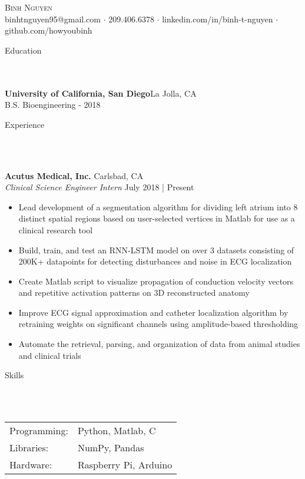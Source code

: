 \documentclass[a4paper]{article}
\newcommand{\lineunder} {
    \vspace*{-8pt} \\
    \hspace*{-18pt} \hrulefill \\
}
\newcommand{\header} [1] {
    {\hspace*{-18pt}\vspace*{6pt} \Large{#1} }
    \vspace*{-6pt} 
    \lineunder
}
\begin{document}
\vspace*{-40pt}

    

\vspace*{-10pt}
\begin{center}
	{\Huge \scshape {Binh Nguyen}}\\
	binhtnguyen95@gmail.com $\cdot$ 209.406.6378 $\cdot$ linkedin.com/in/binh-t-nguyen $\cdot$ github.com/howyoubinh\\
\end{center}

\header{Education}
\textbf{University of California, San Diego}\hfill La Jolla, CA\\
B.S. Bioengineering \hfill  - 2018\\
\vspace{2mm}

\header{Experience}
\vspace{1mm}

\textbf{Acutus Medical, Inc.} \hfill Carlsbad, CA\\
\textit{Clinical Science Engineer Intern} \hfill July 2018 | Present\\
\vspace{-1mm}
\begin{itemize} \itemsep 1pt
	\item Lead development of a segmentation algorithm for dividing left atrium into 8 distinct spatial regions based on user-selected vertices in Matlab for use as a clinical research tool
	\item Build, train, and test an RNN-LSTM model on over 3 datasets consisting of 200K+ datapoints for detecting disturbances and noise in ECG localization
	\item Create Matlab script to visualize propagation of conduction velocity vectors and repetitive activation patterns on 3D reconstructed anatomy
	\item Improve ECG signal approximation and catheter localization algorithm by retraining weights on significant channels using amplitude-based thresholding
	\item Automate the retrieval, parsing, and organization of data from animal studies and clinical trials
\end{itemize}

\header{Skills}
\begin{tabular}{ l l }
	Programming: & Python, Matlab, C  \\
	Libraries:   & NumPy, Pandas         \\
	Hardware:    & Raspberry Pi, Arduino \\
\end{tabular}
\vspace{2mm}
\end{document}
